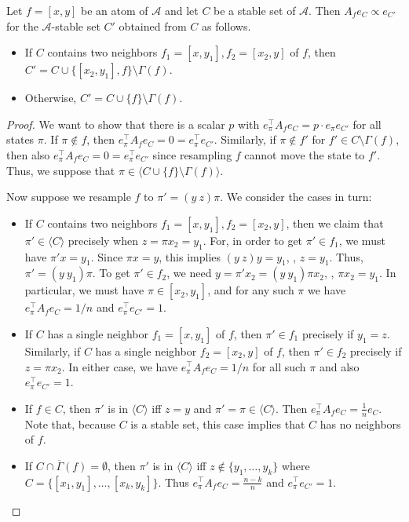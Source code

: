 \documentclass{toc}
\begin{document}
\begin{proposition}
\label{add-1-prop}
Let $f = [x,y]$ be an atom of $\mathcal A$ and let $C$ be a stable set of $\mathcal A$. Then $A_f e_C \propto e_{C'}$ for the $\mathcal A$-stable set $C'$ obtained from $C$ as follows. %
\begin{itemize}
\item If $C$ contains two neighbors $f_1 = [x,y_1], f_2 = [x_2,y]$ of $f$, then $C' = C \cup \{ [x_2, y_1], f \} \setminus \Gamma(f)$.
\item Otherwise,  $C' = C \cup \{ f \} \setminus \Gamma(f)$.
\end{itemize}
\end{proposition}
\begin{proof}
We want to show that there is a scalar $p$ with $e_{\pi}^{\top} A_f e_C = p \cdot e_{\pi} e_{C'}$ for all states $\pi$.  If $\pi \notin f$, then $e_{\pi}^{\top} A_f e_C = 0 = e_{\pi}^{\top} e_{C'}$. Similarly, if $\pi \notin f'$ for $f' \in C \setminus \Gamma(f)$, then also $e_{\pi}^{\top} A_f e_C = 0 = e_{\pi}^{\top} e_{C'}$ since resampling $f$ cannot move the state to $f'$.  Thus, we suppose that $\pi \in \langle C \cup \{f \} \setminus \Gamma(f) \rangle$. 

Now suppose we resample $f$ to $\pi' = (y \ z) \pi$. We consider the cases in turn:
\begin{itemize}
\item If $C$ contains two neighbors $f_1 = [x,y_1], f_2 = [x_2,y]$, then we claim that $\pi' \in \langle C \rangle$ precisely when $z = \pi x_2 = y_1$. For, in order to get $\pi' \in f_1$,  we must have $\pi' x = y_1$. Since $\pi x = y$, this implies $(y \ z) y = y_1$, \ie, $z = y_1$. Thus, $\pi' = (y \ y_1) \pi$. To get $\pi' \in f_2$, we need $y = \pi' x_2 = (y \ y_1) \pi x_2$, \ie, $\pi x_2 = y_1$.   In particular, we must have $\pi \in [x_2, y_1]$, and for any such $\pi$ we have $e_{\pi}^{\top} A_f e_C = 1/n$ and $e_{\pi}^{\top} e_{C'} = 1$.

\item If  $C$ has a single neighbor $f_1 = [x, y_1]$ of $f$, then $\pi' \in f_1$ precisely if $y_1 = z$. Similarly, if $C$ has a single neighbor $f_2 = [x_2, y]$ of $f$, then $\pi' \in f_2$ precisely if $z = \pi x_2$.  In either case, we have $e_{\pi}^{\top} A_f e_C = 1/n$ for all such $\pi$ and also $e_{\pi}^{\top} e_{C'} = 1$.

\item If $f \in C$, then $\pi'$ is in $\langle C \rangle$ iff $z =  y$ and $\pi' = \pi \in \langle C \rangle$. Then $e_{\pi}^{\top} A_f e_C = \frac{1}{n} e_C$. Note that, because $C$ is a stable set, this case implies that $C$ has no neighbors of $f$.

 \item If $C \cap \overline \Gamma(f) = \emptyset$, then $\pi'$ is in $\langle C \rangle$ iff $z \notin \{ y_1, \dots, y_k \}$ where $C = \{ [x_1, y_1], \dots, [x_k, y_k] \}$. Thus $e_{\pi}^{\top} A_f e_C = \frac{n - k}{n}$ and $e_{\pi}^{\top} e_{C'} = 1$. \qedhere
 \end{itemize}
\end{proof}
\end{document}
